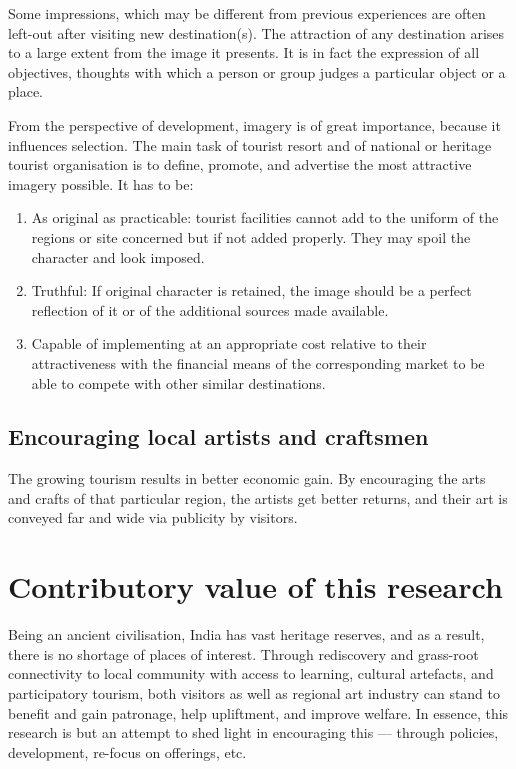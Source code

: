 Some impressions, which may be different from previous experiences are often left-out after visiting new destination(s). The attraction of any destination arises to a large extent from the image it presents. It is in fact the expression of all objectives, thoughts with which a person or group judges a particular object or a place.

From the perspective of development, imagery is of great importance, because it influences selection. The main task of tourist resort and of national or heritage tourist organisation is to define, promote, and advertise the most attractive imagery possible. It has to be:

\begin{enumerate}
  \item As original as practicable: tourist facilities cannot add to the uniform of the regions or site concerned but if not added properly. They may spoil the character and look imposed.
  \item Truthful: If original character is retained, the image should be a perfect reflection of it or of the additional sources made available.
  \item Capable of implementing at an appropriate cost relative to their attractiveness with the financial means of the corresponding market to be able to compete with other similar destinations.
\end{enumerate} 


\subsection{Encouraging local artists and craftsmen} %
\label{sub:encor}

The growing tourism results in better economic gain. By encouraging the arts and crafts of that particular region, the artists get better returns, and their art is conveyed far and wide via publicity by visitors.



\section{Contributory value of this research} %
\label{sec:cvalue}

Being an ancient civilisation, India has vast heritage reserves, and as a result, there is no shortage of places of interest. Through rediscovery and grass-root connectivity to local community with access to learning, cultural artefacts, and participatory tourism, both visitors as well as regional art industry can stand to benefit and gain patronage, help upliftment, and improve welfare. In essence, this research is but an attempt to shed light in encouraging this --- through policies, development, re-focus on offerings, etc.


